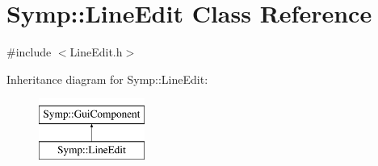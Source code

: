 \hypertarget{class_symp_1_1_line_edit}{\section{Symp\-:\-:Line\-Edit Class Reference}
\label{class_symp_1_1_line_edit}
}


{\ttfamily \#include $<$Line\-Edit.\-h$>$}

Inheritance diagram for Symp\-:\-:Line\-Edit\-:\begin{figure}[H]
\begin{center}
\leavevmode
\includegraphics[height=2.000000cm]{class_symp_1_1_line_edit}
\end{center}
\end{figure}
